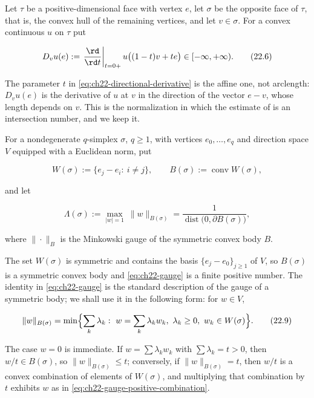 \begin{definition}
\label{def:ch22-directional-derivative}
Let $\tau$ be a positive-dimensional face with vertex $e$, let
$\sigma$ be the opposite
face of $\tau$, that is, the convex hull of the remaining vertices, and
let $v\in\sigma$.  For a convex continuous $u$ on $\tau$ put

\[
 D_v u(e)
   :=\left.\frac{\rd}{\rd t}\right|_{t=0+}
      u\bigl((1-t)v+te\bigr)\in[-\infty,+\infty).
\tag{22.6}\label{eq:ch22-directional-derivative}
\]
\end{definition}

The parameter $t$ in \eqref{eq:ch22-directional-derivative} is the affine
one, not arclength: $D_vu(e)$ is the derivative of $u$ at $v$ in the
direction of the vector $e-v$, whose length depends on $v$.  This is the
normalization in which the estimate of  is an
intersection number, and we keep it.

\begin{definition}
\label{def:ch22-simplex-gauge}
For a nondegenerate $q$-simplex $\sigma$, $q\geq1$, with vertices
$e_0,\ldots,e_q$ and direction space $V$ equipped with a Euclidean norm,
put

\[
 W(\sigma):=\{e_j-e_i:\ i\neq j\},
 \qquad
 B(\sigma):=\operatorname{conv}W(\sigma),
\tag{22.7}\label{eq:ch22-gauge-body}
\]

and let

\[
 \Lambda(\sigma)
   :=\max_{|w|=1}\ \|w\|_{B(\sigma)}
   =\frac1{\operatorname{dist}\bigl(0,\partial B(\sigma)\bigr)},
\tag{22.8}\label{eq:ch22-gauge}
\]

where $\|\cdot\|_{B}$ is the Minkowski gauge of the symmetric convex body
$B$.
\end{definition}

The set $W(\sigma)$ is symmetric and contains the basis
$\{e_j-e_0\}_{j\geq1}$ of $V$, so $B(\sigma)$ is a symmetric convex
body and \eqref{eq:ch22-gauge} is a finite positive number.  The identity in
\eqref{eq:ch22-gauge} is the standard description of the gauge of a
symmetric body; we shall use it in the following form: for $w\in V$,

\[
 \|w\|_{B(\sigma)}
 =\min\Bigl\{\sum_k\lambda_k:\ w=\sum_k\lambda_kw_k,\
       \lambda_k\geq0,\ w_k\in W(\sigma)\Bigr\}.
\tag{22.9}\label{eq:ch22-gauge-positive-combination}
\]

The case $w=0$ is immediate.  If $w=\sum\lambda_kw_k$ with
$\sum\lambda_k=t>0$, then
$w/t\in B(\sigma)$, so $\|w\|_{B(\sigma)}\leq t$; conversely, if
$\|w\|_{B(\sigma)}=t$, then $w/t$ is a convex combination of elements of
$W(\sigma)$, and multiplying that combination by $t$ exhibits $w$ as
in \eqref{eq:ch22-gauge-positive-combination}.

